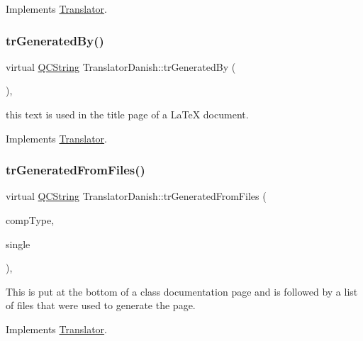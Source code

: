 Implements \mbox{\hyperlink{class_translator}{Translator}}.

\mbox{\label{class_translator_danish_a2de240cadcdf4de2b63107a9b41d2faf}} 
\subsubsection{\texorpdfstring{trGeneratedBy()}{trGeneratedBy()}}
{\footnotesize\ttfamily virtual \mbox{\hyperlink{class_q_c_string}{Q\+C\+String}} Translator\+Danish\+::tr\+Generated\+By (\begin{DoxyParamCaption}{ }\end{DoxyParamCaption})\hspace{0.3cm}{\ttfamily [inline]}, {\ttfamily [virtual]}}

this text is used in the title page of a La\+TeX document. 

Implements \mbox{\hyperlink{class_translator}{Translator}}.

\mbox{\label{class_translator_danish_a36ecff3054f04a48bd925a5504268595}} 
\subsubsection{\texorpdfstring{trGeneratedFromFiles()}{trGeneratedFromFiles()}}
{\footnotesize\ttfamily virtual \mbox{\hyperlink{class_q_c_string}{Q\+C\+String}} Translator\+Danish\+::tr\+Generated\+From\+Files (\begin{DoxyParamCaption}\item[{\mbox{\hyperlink{class_class_def_ae70cf86d35fe954a94c566fbcfc87939}{Class\+Def\+::\+Compound\+Type}}}]{comp\+Type,  }\item[{bool}]{single }\end{DoxyParamCaption})\hspace{0.3cm}{\ttfamily [inline]}, {\ttfamily [virtual]}}

This is put at the bottom of a class documentation page and is followed by a list of files that were used to generate the page. 

Implements \mbox{\hyperlink{class_translator}{Translator}}.

